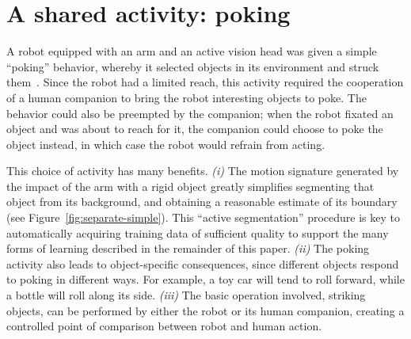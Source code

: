 \section{A shared activity: poking}

\label{sect:poking}

A robot equipped with an arm and an active vision head was given a
simple ``poking'' behavior, whereby it selected objects in its
environment and struck them~\citep{fitzpatrick02towards}.
Since the robot had a limited reach,
this activity required the cooperation of a human
companion to bring the robot interesting objects to poke.
The behavior could also be preempted by the companion; when the robot
fixated an object and was about to reach for it, the companion
could choose to poke the object instead, in which case the robot
would refrain from acting.

This choice of activity has many benefits.  
%
{\em (i)}
The motion signature
generated by the impact of the arm with a rigid object greatly
simplifies segmenting that object from its background, and obtaining a
reasonable estimate of its boundary (see
Figure~\ref{fig:separate-simple}).  
This ``active segmentation''
procedure is key to automatically acquiring training data of
sufficient quality to support the many forms of learning described in
the remainder of this paper.
%
{\em (ii)}
The poking activity also leads to object-specific consequences, since
different objects respond to poking in different ways.  For example,
a toy car will tend to roll forward, while a bottle will roll along its
side.
%
{\em (iii)}
The basic operation involved, striking objects, can be performed
by either the robot or its human companion, creating a
controlled point of 
comparison between robot and human action.


%



